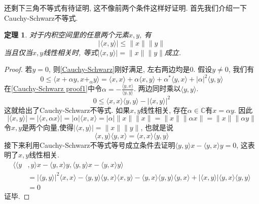 \documentclass[a4paper,11pt]{article}
\newtheorem{theorem}{\hspace{2em}定理}[section]
\newtheorem{proof}{证明}[section]
\begin{document}
还剩下三角不等式有待证明, 这不像前两个条件这样好证明. 首先我们介绍一下Cauchy-Schwarz不等式.
\begin{theorem}
  对于内积空间里的任意两个元素$x,y$, 有
  \begin{equation}\label{Cauchy-Schwarz}
    |\langle x,y\rangle|\leq\|x\|\|y\|
  \end{equation}
  当且仅当$x,y$线性相关时, 等式$|\langle x,y\rangle|=\|x\|\|y\|$成立.
\end{theorem}
\begin{proof}
  若$y=0$, 则\eqref{Cauchy-Schwarz}刚好满足, 左右两边均是$0$. 假设$y\neq 0$, 我们有
  \begin{equation*}\label{Cauchy-Schwarz proof1}
    0\leq\langle x+\alpha y,x+_\alpha y\rangle=\langle x,x\rangle+\alpha\langle x,y\rangle+\alpha^*\langle y,x\rangle+|\alpha|^2\langle y,y\rangle
  \end{equation*}
  在\eqref{Cauchy-Schwarz proof1}中令$\alpha=-\frac{\langle y,x\rangle}{\langle y,y\rangle}$. 两边同时乘以$\langle y,y\rangle$.
  \begin{equation*}
    0\leq\langle x,x\rangle\langle y,y\rangle-|\langle x,y\rangle|^2
  \end{equation*}
  这就给出了Cauchy-Schwarz不等式. 如果$x,y$线性相关, 存在$\alpha\in \mathbb{C}$有$x=\alpha y$. 因此
  \begin{equation*}
    |\langle x,y\rangle|=|\langle x,\alpha x\rangle|=|\alpha|\langle x,x\rangle=|\alpha|\|x\|\|x\|=\|x\|\|\alpha x\|=\|x\|\|\alpha y\|
  \end{equation*}
  令$x,y$是两个向量,使得$|\langle x,y\rangle|=\|x\|\|y\|$, 也就是说
  \begin{equation*}
    \langle x,y\rangle\langle y,x\rangle=\langle x,x\rangle\langle y,y\rangle
  \end{equation*}
  接下来利用Cauchy-Schwarz不等式等号成立条件去证明$\langle y,y\rangle x-\langle y,x\rangle y=0$, 这表明了$x,y$线性相关.
  \begin{equation*}
  \begin{split}
     \langle\langle y&,y\rangle x-\langle y,x\rangle y,\langle y,y\rangle x-\langle y,x\rangle y\rangle \\
       & =|\langle y,y\rangle|^2\langle x,x\rangle-\langle y,y\rangle\langle y,x\rangle\langle x,y\rangle-\langle y,x\rangle\langle y,y\rangle\langle y,x\rangle+|\langle x,y\rangle|\langle y,x\rangle\langle y,y\rangle \\
       & =0
  \end{split}
  \end{equation*}
  证毕.
\end{proof}
\end{document}
